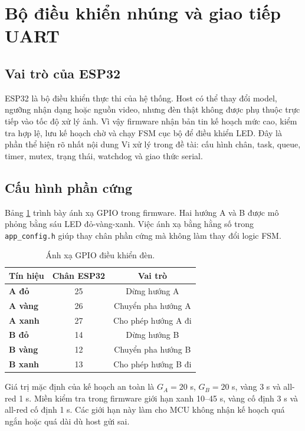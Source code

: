 \section{Bộ điều khiển nhúng và giao tiếp UART}

\subsection{Vai trò của ESP32}

ESP32 là bộ điều khiển thực thi của hệ thống. Host có thể thay đổi model, ngưỡng nhận dạng hoặc nguồn video, nhưng đèn thật không được phụ thuộc trực tiếp vào tốc độ xử lý ảnh. Vì vậy firmware nhận bản tin kế hoạch mức cao, kiểm tra hợp lệ, lưu kế hoạch chờ và chạy FSM cục bộ để điều khiển LED. Đây là phần thể hiện rõ nhất nội dung Vi xử lý trong đề tài: cấu hình chân, task, queue, timer, mutex, trạng thái, watchdog và giao thức serial.

\subsection{Cấu hình phần cứng}

Bảng \ref{tab:gpio-map} trình bày ánh xạ GPIO trong firmware. Hai hướng A và B được mô phỏng bằng sáu LED đỏ-vàng-xanh. Việc ánh xạ bằng hằng số trong \texttt{app\_config.h} giúp thay chân phần cứng mà không làm thay đổi logic FSM.

\begin{table}[H]
\centering
\caption{Ánh xạ GPIO điều khiển đèn.}
\label{tab:gpio-map}
\begin{tabular}{>{\bfseries}lcc}
\toprule
Tín hiệu & Chân ESP32 & Vai trò \\
\midrule
A đỏ & 25 & Dừng hướng A \\
A vàng & 26 & Chuyển pha hướng A \\
A xanh & 27 & Cho phép hướng A đi \\
B đỏ & 14 & Dừng hướng B \\
B vàng & 12 & Chuyển pha hướng B \\
B xanh & 13 & Cho phép hướng B đi \\
\bottomrule
\end{tabular}
\end{table}

Giá trị mặc định của kế hoạch an toàn là \(G_A=20\) s, \(G_B=20\) s, vàng 3 s và all-red 1 s. Miền kiểm tra trong firmware giới hạn xanh 10--45 s, vàng cố định 3 s và all-red cố định 1 s. Các giới hạn này làm cho MCU không nhận kế hoạch quá ngắn hoặc quá dài dù host gửi sai.

